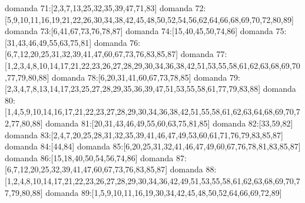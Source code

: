 domanda 71:[2,3,7,13,25,32,35,39,47,71,83]
domanda 72:[5,9,10,11,16,19,21,22,26,30,34,38,42,45,48,50,52,54,56,62,64,66,68,69,70,72,80,89]
domanda 73:[6,41,67,73,76,78,87]
domanda 74:[15,40,45,50,74,86]
domanda 75:[31,43,46,49,55,63,75,81]
domanda 76:[6,7,12,20,25,31,32,39,41,47,60,67,73,76,83,85,87]
domanda 77:[1,2,3,4,8,10,14,17,21,22,23,26,27,28,29,30,34,36,38,42,51,53,55,58,61,62,63,68,69,70,77,79,80,88]
domanda 78:[6,20,31,41,60,67,73,78,85]
domanda 79:[2,3,4,7,8,13,14,17,23,25,27,28,29,35,36,39,47,51,53,55,58,61,77,79,83,88]
domanda 80:[1,4,5,9,10,14,16,17,21,22,23,27,28,29,30,34,36,38,42,51,55,58,61,62,63,64,68,69,70,72,77,80,88]
domanda 81:[20,31,43,46,49,55,60,63,75,81,85]
domanda 82:[33,59,82]
domanda 83:[2,4,7,20,25,28,31,32,35,39,41,46,47,49,53,60,61,71,76,79,83,85,87]
domanda 84:[44,84]
domanda 85:[6,20,25,31,32,41,46,47,49,60,67,76,78,81,83,85,87]
domanda 86:[15,18,40,50,54,56,74,86]
domanda 87:[6,7,12,20,25,32,39,41,47,60,67,73,76,83,85,87]
domanda 88:[1,2,4,8,10,14,17,21,22,23,26,27,28,29,30,34,36,42,49,51,53,55,58,61,62,63,68,69,70,77,79,80,88]
domanda 89:[1,5,9,10,11,16,19,30,34,42,45,48,50,52,64,66,69,72,89]



